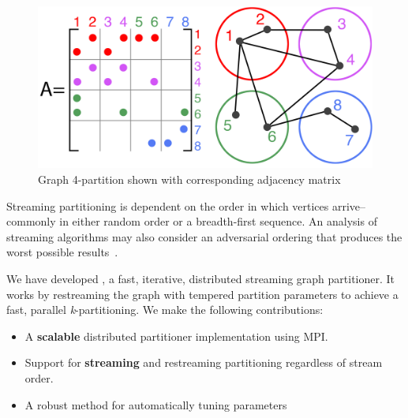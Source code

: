 \begin{figure}[h]
\centering
\includegraphics[width=0.85\columnwidth] {figures/graphpart1.pdf}
\caption[Caption for]{Graph 4-partition shown with corresponding adjacency matrix}
\label{fig:0}
\end{figure}

Streaming partitioning is dependent on the order in which vertices arrive-- commonly in either random order or a breadth-first sequence. An analysis of streaming algorithms may also consider an adversarial ordering that produces the worst possible results~\cite{Stanton:2012:SGP:2339530.2339722}.

We have developed \ourmethod, a fast, iterative, distributed streaming graph partitioner.
It works by restreaming the graph with tempered partition parameters to achieve a fast, parallel \textit{k}-partitioning.
We make the following contributions:
\begin{itemize}
\item A \textbf{scalable} distributed partitioner implementation using MPI.
\item Support for \textbf{streaming} and restreaming partitioning regardless of stream order.
\item A robust method for automatically tuning \ourmethod parameters 
\end{itemize}



